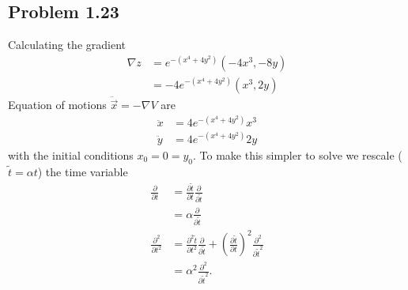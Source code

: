 \documentclass[10pt,a4paper]{book}
\theoremstyle{definition}
\begin{document}
\subsection{Problem 1.23}
Calculating the gradient
\begin{align}
\nabla z&=e^{-(x^4+4y^2)}(-4x^3,-8y)\\
&=-4e^{-(x^4+4y^2)}(x^3,2y)
\end{align}
Equation of motions $\ddot{\vec{x}}=-\nabla V$ are
\begin{align}
\ddot x&=4e^{-(x^4+4y^2)}x^3\\
\ddot y&=4e^{-(x^4+4y^2)}2y
\end{align}
with the initial conditions $x_0=0=y_0$. To make this simpler to solve we rescale ($\tilde t=\alpha t$) the time variable
\begin{align}
\frac{\partial}{\partial t}
&=\frac{\partial\tilde{t}}{\partial t}\frac{\partial}{\partial \tilde{t}}\\
&=\alpha\frac{\partial}{\partial \tilde{t}}\\
\frac{\partial^2}{\partial t^2}
&=\frac{\partial^2\tilde{t}}{\partial t^2}\frac{\partial}{\partial \tilde{t}}+\left(\frac{\partial\tilde{t}}{\partial t}\right)^2\frac{\partial^2}{\partial {\tilde t}^2}\\
&=\alpha^2\frac{\partial^2}{\partial {\tilde t}^2}.
\end{align}
\end{document}
